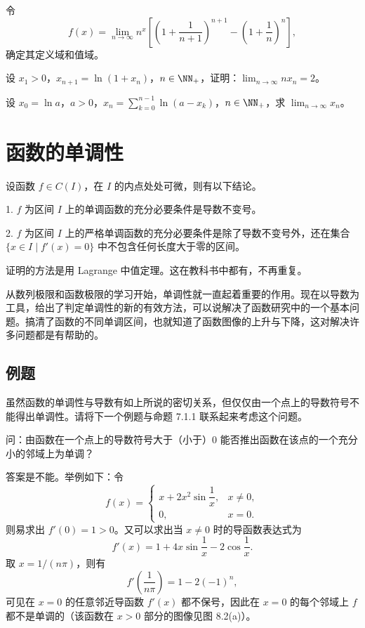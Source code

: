 \begin{xexercise}[8]
令
  \[
    f(x)=\lim_{n\to\infty}n^x\left[\left(1+\frac1{n+1}\right)^{n+1}-\left(1+\frac1n\right)^n\right],
  \]
  确定其定义域和值域。
\end{xexercise}

\begin{xexercise}[9]
设 $x_1>0$，$x_{n+1}=\ln(1+x_n)$，$n\in\NN_+$，证明：$\displaystyle\lim_{n\to\infty}nx_n=2$。
\end{xexercise}

\begin{xexercise}[10]
设 $x_0=\ln a$，$a>0$，$x_n=\displaystyle\sum_{k=0}^{n-1}\ln(a-x_k)$，$n\in\NN_+$，求 $\displaystyle\lim_{n\to\infty}x_n$。
\end{xexercise}

\section{函数的单调性}

设函数 $f\in C(I)$，在 $I$ 的内点处处可微，则有以下结论。

1. $f$ 为区间 $I$ 上的单调函数的充分必要条件是导数不变号。

2. $f$ 为区间 $I$ 上的严格单调函数的充分必要条件是除了导数不变号外，还在集合 $\{x\in I\mid f'(x)=0\}$ 中不包含任何长度大于零的区间。

证明的方法是用 Lagrange 中值定理。这在教科书中都有，不再重复。

从数列极限和函数极限的学习开始，单调性就一直起着重要的作用。现在以导数为工具，给出了判定单调性的新的有效方法，可以说解决了函数研究中的一个基本问题。搞清了函数的不同单调区间，也就知道了函数图像的上升与下降，这对解决许多问题都是有帮助的。

\subsection{例题}

虽然函数的单调性与导数有如上所说的密切关系，但仅仅由一个点上的导数符号不能得出单调性。请将下一个例题与命题 7.1.1 联系起来考虑这个问题。

\begin{xexample}[8.2.1]
问：由函数在一个点上的导数符号大于（小于）0 能否推出函数在该点的一个充分小的邻域上为单调？
\end{xexample}
\begin{xsolution}
答案是不能。举例如下：令
\[
  f(x)=
  \begin{cases}
    x+2x^2\sin\dfrac1x, & x\ne0,\\
    0, & x=0.
  \end{cases}
\]
则易求出 $f'(0)=1>0$。又可以求出当 $x\ne0$ 时的导函数表达式为
\[
  f'(x)=1+4x\sin\frac1x-2\cos\frac1x.
\]
取 $x=1/(n\pi)$，则有
\[
  f'\left(\frac1{n\pi}\right)=1-2(-1)^n,
\]
可见在 $x=0$ 的任意邻近导函数 $f'(x)$ 都不保号，因此在 $x=0$ 的每个邻域上 $f$ 都不是单调的（该函数在 $x>0$ 部分的图像见图 8.2(a)）。
\end{xsolution}

